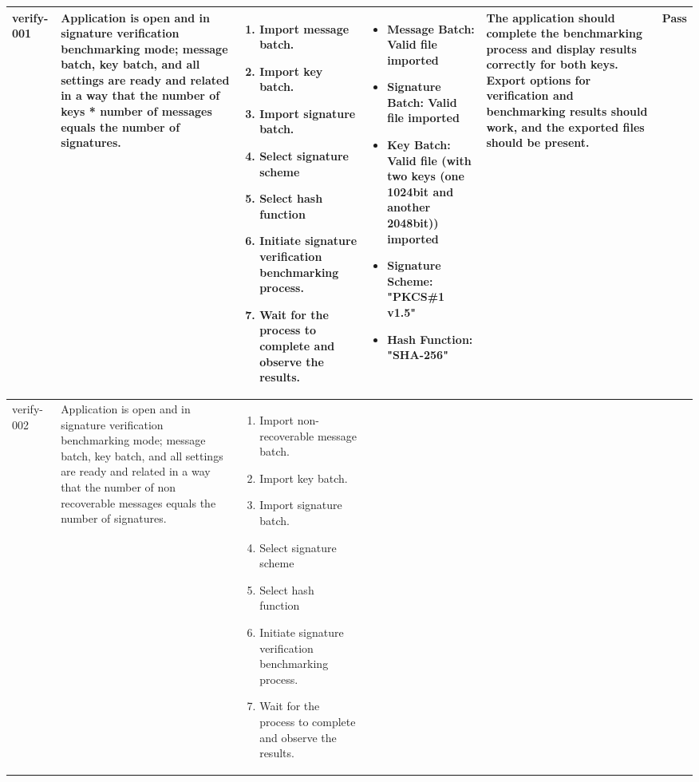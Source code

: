 \documentclass[]{final_report}
\theoremstyle{definition}
\begin{document}
\begin{longtable}{|l|p{2.5cm}|p{2.8cm}|p{3cm}|p{2cm}|p{1.5cm}|}
  \hline
  \endlastfoot
  verify-001 & Application is open and in signature verification benchmarking mode; message batch, key batch, and all settings are ready and related in a way that the number of keys * number of messages equals the number of signatures. &
  \begin{enumerate}
    \item Import message batch.
    \item Import key batch.
    \item Import signature batch.
     \item Select signature scheme 
    \item Select hash function
    \item Initiate signature verification benchmarking process.
    \item Wait for the process to complete and observe the results.
  \end{enumerate} & 
  \begin{itemize}
    \item Message Batch: Valid file imported
     \item Signature Batch: Valid file imported
    \item Key Batch: Valid file  (with two keys (one 1024bit and another 2048bit)) imported 
    \item Signature Scheme: "PKCS\#1 v1.5"
    \item Hash Function: "SHA-256"
  \end{itemize} &
  The application should complete the benchmarking process and display results correctly for both keys. Export options for verification and benchmarking results should work, and the exported files should be present. & Pass \\
  \hline
 verify-002 & Application is open and in signature verification benchmarking mode; message batch, key batch, and all settings are ready and related in a way that the number of non recoverable messages equals the number of signatures. &
  \begin{enumerate}
    \item Import non-recoverable message batch.
    \item Import key batch.
    \item Import signature batch.
     \item Select signature scheme 
    \item Select hash function
    \item Initiate signature verification benchmarking process.
    \item Wait for the process to complete and observe the results.

\end{enumerate}
\end{longtable}
\end{document}
